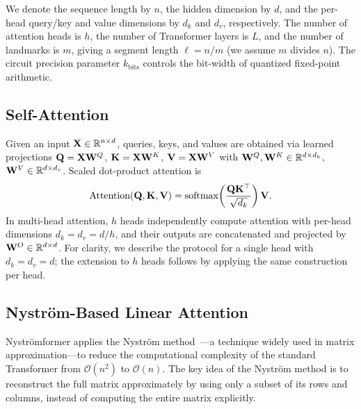\documentclass[runningheads]{llncs}
\begin{document}
We denote the sequence length by $n$, the hidden dimension by $d$, and the per-head query/key and value dimensions by $d_k$ and $d_v$, respectively. The number of attention heads is $h$, the number of Transformer layers is $L$, and the number of landmarks is $m$, giving a segment length $\ell = n/m$ (we assume $m$ divides $n$). The circuit precision parameter $k_{\text{bits}}$ controls the bit-width of quantized fixed-point arithmetic.

\subsection{Self-Attention}
Given an input ${\mathbf{X}} \in \mathbb{R}^{n \times d}$, queries, keys, and values are obtained via learned projections ${\mathbf{Q}} = {\mathbf{X}} {\mathbf{W}}^Q$, ${\mathbf{K}} = {\mathbf{X}} {\mathbf{W}}^K$, ${\mathbf{V}} = {\mathbf{X}} {\mathbf{W}}^V$ with ${\mathbf{W}}^Q, {\mathbf{W}}^K \in \mathbb{R}^{d \times d_k}$, ${\mathbf{W}}^V \in \mathbb{R}^{d \times d_v}$. Scaled dot-product attention is
\[
    \text{Attention} ({\mathbf{Q}}, {\mathbf{K}}, {\mathbf{V}} ) = {\mathrm{softmax}}\!\left(\frac{{\mathbf{Q}}{\mathbf{K}}^\top}{\sqrt{d_k}}\right){\mathbf{V}}.
\]
In multi-head attention, $h$ heads independently compute attention with per-head dimensions $d_k = d_v = d/h$, and their outputs are concatenated and projected by ${\mathbf{W}}^O \in \mathbb{R}^{d \times d}$. For clarity, we describe the protocol for a single head with $d_k = d_v = d$; the extension to $h$ heads follows by applying the same construction per head.

\subsection{Nystr\"om-Based Linear Attention}\label{subsec:nystrom-linear}
Nystr\"omformer applies the Nystr\"om method~\cite{Nystromformer}---a technique widely used in matrix approximation---to reduce the computational complexity of the standard Transformer from $\mathcal{O}(n^2)$ to $\mathcal{O}(n)$. The key idea of the Nystr\"om method is to reconstruct the full matrix approximately by using only a subset of its rows and columns, instead of computing the entire matrix explicitly.
\end{document}
